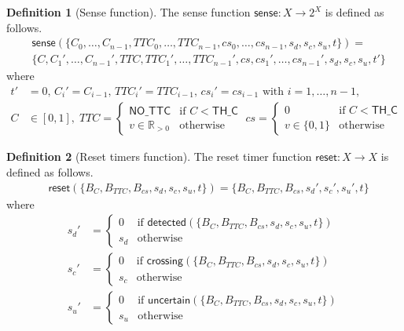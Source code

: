 \documentclass[12pt]{article}
\theoremstyle{definition}
\newtheorem{definition}{Definition}[section]
\begin{document}
\begin{definition}[Sense function]
The sense function $\mathsf{sense}: X \to 2^X$ is defined as follows.
    \[
    \begin{aligned}
        &\mathsf{sense}(\{C_0, \ldots, C_{n-1}, TTC_0, \ldots, TTC_{n-1}, cs_0, \ldots, cs_{n-1}, s_d, s_c, s_u, t\}) = \\
        &\{C, C_1', \ldots, C_{n-1}', TTC, TTC_1', \ldots, TTC_{n-1}', cs, cs_1', \ldots, cs_{n-1}', s_d, s_c, s_u, t'\}
    \end{aligned}
\]
where
\[
    \begin{aligned}
    t' &= 0, \, C_i' = C_{i-1}, \, TTC_i' = TTC_{i-1}, \, cs_i' = cs_{i-1} \text{ with } i = 1, \dots, n-1, \\ 
    C &\in [0,1], \;
    TTC =     
    \begin{cases}
        \mathsf{NO\_TTC} & \text{if } C < \mathsf{TH\_C} \\
        v \in \mathbb{R}_{>0} & \text{otherwise}
    \end{cases} \;
    cs =     
    \begin{cases}
        0 & \text{if } C < \mathsf{TH\_C} \\
        v \in \{0,1\} & \text{otherwise}
    \end{cases} 
    \end{aligned}
\]
\end{definition}



\begin{definition}[Reset timers function]
The reset timer function $\mathsf{reset}: X \to X$ is defined as follows.
    \[
    \begin{aligned}
        &\mathsf{reset}(\{B_C, B_{TTC}, B_{cs},  s_d, s_c, s_u, t\}) = \{B_C, B_{TTC}, B_{cs},  s_d', s_c', s_u',t\}
    \end{aligned}
\]
where 
\[
    \begin{aligned}
    s_d' &=     
    \begin{cases}
        0 & \text{if } \mathsf{detected}(\{B_C, B_{TTC}, B_{cs}, s_d, s_c, s_u, t\}) \\
        s_d & \text{otherwise}
    \end{cases}\\
    s_c' &=     
    \begin{cases}
        0 & \text{if } \mathsf{crossing}(\{B_C, B_{TTC}, B_{cs}, s_d, s_c, s_u, t\}) \\
        s_c & \text{otherwise}
    \end{cases}\\
    s_u' &=     
    \begin{cases}
        0 & \text{if } \mathsf{uncertain}(\{B_C, B_{TTC}, B_{cs}, s_d, s_c, s_u, t\}) \\
        s_u & \text{otherwise}
    \end{cases}\\
    \end{aligned}
\]
\end{definition}
\end{document}
